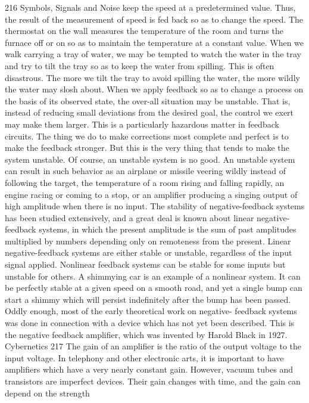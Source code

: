 {{{{{{{{{{{216
Symbols, Signals and Noise
keep the speed at a predetermined value. Thus, the result of the
measurement of speed is fed back so as to change the speed. The
thermostat on the wall measures the temperature of the room and
turns the furnace off or on so as to maintain the temperature at a
constant value. When we walk carrying a tray of water, we may
be tempted to watch the water in the tray and try to tilt the tray
so as to keep the water from spilling. This is often disastrous. The
more we tilt the tray to avoid spilling the water, the more wildly
the water may slosh about. When we apply feedback so as to
change a process on the basis of its observed state, the over-all
situation may be unstable. That is, instead of reducing small deviations
from the desired goal, the control we exert may make
them larger.
This is a particularly hazardous matter in feedback circuits. The
thing we do to make corrections most complete and perfect is to
make the feedback stronger. But this is the very thing that tends
to make the system unstable. Of course, an unstable system is no
good. An unstable system can result in such behavior as an airplane
or missile veering wildly instead of following the target, the temperature
of a room rising and falling rapidly, an engine racing or
coming to a stop, or an amplifier producing a singing output of
high amplitude when there is no input.
The stability of negative-feedback systems has been studied
extensively, and a great deal is known about linear negative-
feedback systems, in which the present amplitude is the sum of
past amplitudes multiplied by numbers depending only on remoteness
from the present.
Linear negative-feedback systems are either stable or unstable,
regardless of the input signal applied. Nonlinear feedback systems
can be stable for some inputs but unstable for others. A shimmying
car is an example of a nonlinear system. It can be perfectly stable
at a given speed on a smooth road, and yet a single bump can start
a shimmy which will persist indefinitely after the bump has been
passed.
Oddly enough, most of the early theoretical work on negative-
feedback systems was done in connection with a device which has
not yet been described. This is the negative feedback amplifier,
which was invented by Harold Black in 1927.
Cybernetics 217
The gain of an amplifier is the ratio of the output voltage to the
input voltage. In telephony and other electronic arts, it is important
to have amplifiers which have a very nearly constant gain. However,
vacuum tubes and transistors are imperfect devices. Their
gain changes with time, and the gain can depend on the strength
}}}}}}}}}}}
